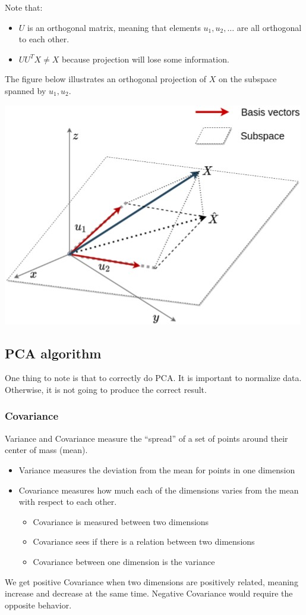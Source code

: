 \documentclass[letterpaper,12pt]{article}
\begin{document}
Note that:
\begin{itemize}
    \item $U$ is an orthogonal matrix, meaning that elements $u_1,u_2,\ldots$ are all orthogonal to each other. 
    \item $UU^T X\neq X$ because projection will lose some information. 
\end{itemize}
 

The figure below illustrates an orthogonal projection of $X$ on the subspace spanned by $u_1,u_2$. 

\includegraphics*{Image/Projection to reduce dimensionality example.jpg}

\subsection{PCA algorithm}

One thing to note is that to correctly do PCA. It is important to normalize data. Otherwise, it is not going to produce the correct result. 

\subsubsection{Covariance}
Variance and Covariance measure the ``spread'' of a set of points around their center of mass (mean).
\begin{itemize}
    \item Variance measures the deviation from the mean for points in one dimension
    \item Covariance measures how much each of the dimensions varies from the mean with respect to each other. 
    \begin{itemize}
        \item Covariance is measured between two dimensions
        \item Covariance sees if there is a relation between two dimensions
        \item Covariance between one dimension is the variance
    \end{itemize}
\end{itemize}
We get positive Covariance when two dimensions are positively related, meaning increase and decrease at the same time. Negative Covariance would require the opposite behavior. 
\end{document}
